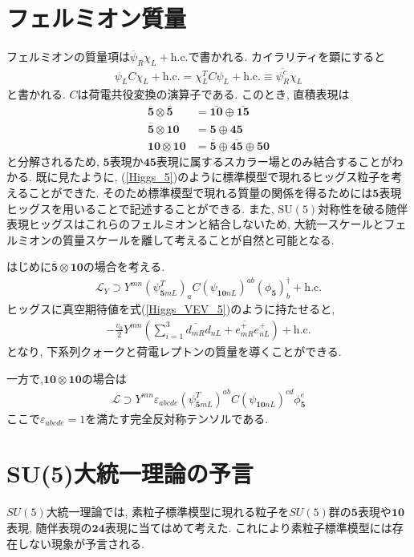\section{フェルミオン質量}
フェルミオンの質量項は$\overline{\psi}_R\chi_L +\mathrm{h.c.}$で書かれる.
カイラリティを顕にすると
\begin{align}
  \psi_L C \chi_L + \mathrm{h.c.} = \chi_L^T C \psi_L + \mathrm{h.c.} \equiv \overline{\psi_R^c}\chi_L
\end{align}
と書かれる. $C$は荷電共役変換の演算子である.
このとき, 直積表現は
\begin{align}
  \overline{\bm{5}}\otimes \bar{\bm{5}} &= \bar{\bm{10}}\oplus\bar{\bm{15}}\nonumber\\
  \overline{\bm{5}}\otimes {\bm{10}} &= \bm{5}\oplus\bm{45}\nonumber\\
  \bm{10}\otimes \bm{10} &= \overline{\bm{5}}\oplus\bar{\bm{45}}\oplus\bm{50}\nonumber
\end{align}
と分解されるため, $\bm{5}$表現か$\bm{45}$表現に属するスカラー場とのみ結合することがわかる.
既に見たように, (\ref{Higgs_5})のように標準模型で現れるヒッグス粒子を考えることができた.
そのため標準模型で現れる質量の関係を得るためには$\bm{5}$表現ヒッグスを用いることで記述することができる.
また, $\mathrm{SU(5)}$対称性を破る随伴表現ヒッグスはこれらのフェルミオンと結合しないため, 大統一スケールとフェルミオンの質量スケールを離して考えることが自然と可能となる.

はじめに$\overline{\bm{5}}\otimes {\bm{10}}$の場合を考える.
\begin{align}
  \mathcal{L}_Y \supset Y^{mn} (\psi^T_{\bm{\overline{5}}mL})_a C (\psi_{\bm{10}nL})^{ab}(\phi_{\bm{5}})_b^\dagger +\mathrm{h.c.}
\end{align}
ヒッグスに真空期待値を式(\ref{Higgs_VEV_5})のように持たせると,
\begin{align}
  -\frac{v_0}{2}Y^{mn}\left(\sum_{i=1}^3\overline{d_{mR}}d_{nL} + \overline{e_{mR}^+}e^+_{nL}\right) + \mathrm{h.c.}
\end{align}
となり, 下系列クォークと荷電レプトンの質量を導くことができる.

一方で,$ \bm{10}\otimes \bm{10}$の場合は
\begin{align}
  \mathcal{L} \supset Y^{mn} \varepsilon_{abcde} (\psi^{T}_{\bm{\overline{5}}mL})^{ab}C (\psi_{\bm{10}nL})^{cd} \phi_{\bm{5}}^e
\end{align}
ここで$\varepsilon_{abcde}=1$を満たす完全反対称テンソルである.
\section{SU(5)大統一理論の予言}
$SU(5)$大統一理論では, 素粒子標準模型に現れる粒子を$SU(5)$群の$\overline{\bm{5}}$表現や$\bm{10}$表現, 随伴表現の$\bm{24}$表現に当てはめて考えた.
これにより素粒子標準模型には存在しない現象が予言される.
